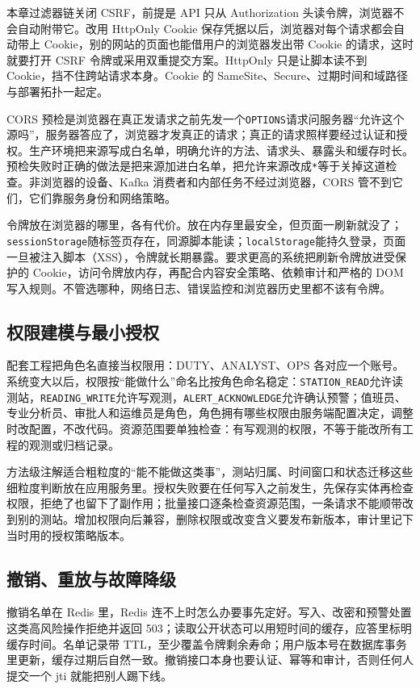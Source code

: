 本章过滤器链关闭 CSRF，前提是 API 只从 Authorization 头读令牌，浏览器不会自动附带它。改用 HttpOnly Cookie 保存凭据以后，浏览器对每个请求都会自动带上 Cookie，别的网站的页面也能借用户的浏览器发出带 Cookie 的请求，这时就要打开 CSRF 令牌或采用双重提交方案。HttpOnly 只是让脚本读不到 Cookie，挡不住跨站请求本身。Cookie 的 SameSite、Secure、过期时间和域路径与部署拓扑一起定。

CORS 预检是浏览器在真正发请求之前先发一个\texttt{OPTIONS}请求问服务器“允许这个源吗”，服务器答应了，浏览器才发真正的请求；真正的请求照样要经过认证和授权。生产环境把来源写成白名单，明确允许的方法、请求头、暴露头和缓存时长。预检失败时正确的做法是把来源加进白名单，把允许来源改成\texttt{*}等于关掉这道检查。非浏览器的设备、Kafka 消费者和内部任务不经过浏览器，CORS 管不到它们，它们靠服务身份和网络策略。

令牌放在浏览器的哪里，各有代价。放在内存里最安全，但页面一刷新就没了；\texttt{sessionStorage}随标签页存在，同源脚本能读；\texttt{localStorage}能持久登录，页面一旦被注入脚本（XSS），令牌就长期暴露。要求更高的系统把刷新令牌放进受保护的 Cookie，访问令牌放内存，再配合内容安全策略、依赖审计和严格的 DOM 写入规则。不管选哪种，网络日志、错误监控和浏览器历史里都不该有令牌。

\subsection{权限建模与最小授权}

配套工程把角色名直接当权限用：DUTY、ANALYST、OPS 各对应一个账号。系统变大以后，权限按“能做什么”命名比按角色命名稳定：\texttt{STATION\_READ}允许读测站，\texttt{READING\_WRITE}允许写观测，\texttt{ALERT\_ACKNOWLEDGE}允许确认预警；值班员、专业分析员、审批人和运维员是角色，角色拥有哪些权限由服务端配置决定，调整时改配置，不改代码。资源范围要单独检查：有写观测的权限，不等于能改所有工程的观测或归档记录。

方法级注解适合粗粒度的“能不能做这类事”，测站归属、时间窗口和状态迁移这些细粒度判断放在应用服务里。授权失败要在任何写入之前发生，先保存实体再检查权限，拒绝了也留下了副作用；批量接口逐条检查资源范围，一条请求不能顺带改到别的测站。增加权限向后兼容，删除权限或改变含义要发布新版本，审计里记下当时用的授权策略版本。

\subsection{撤销、重放与故障降级}

撤销名单在 Redis 里，Redis 连不上时怎么办要事先定好。写入、改密和预警处置这类高风险操作拒绝并返回 503；读取公开状态可以用短时间的缓存，应答里标明缓存时间。名单记录带 TTL，至少覆盖令牌剩余寿命；用户版本号在数据库事务里更新，缓存过期后自然一致。撤销接口本身也要认证、幂等和审计，否则任何人提交一个 jti 就能把别人踢下线。

